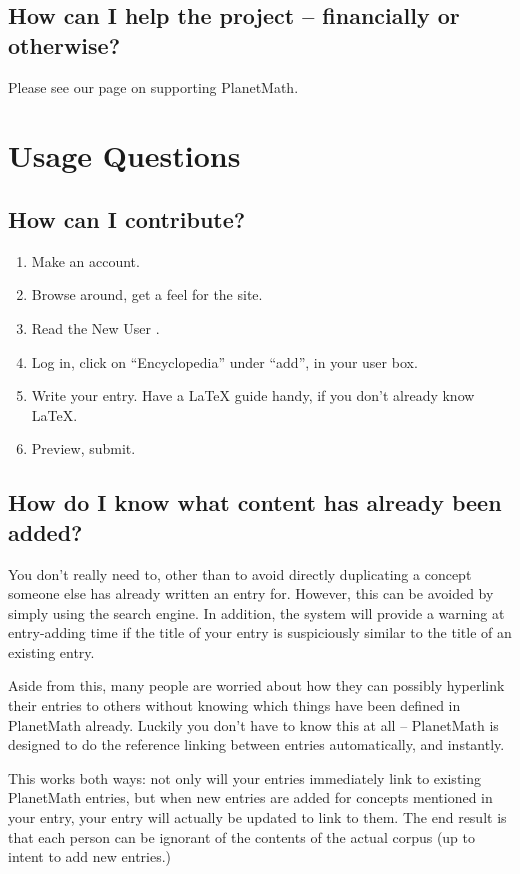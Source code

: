 \subsection{How can I help the project -- financially or otherwise?}
Please see our page on supporting PlanetMath.

\section{Usage Questions}
\subsection{How can I contribute?}
\begin{enumerate}
\item Make an account.
\item Browse around, get a feel for the site.
\item Read the New User .
\item Log in, click on ``Encyclopedia'' under ``add'', in your user box.
\item Write your entry. Have a \LaTeX{} guide handy, if you don't already know \LaTeX{}.
\item Preview, submit. 
\end{enumerate}

\subsection{How do I know what content has already been added?}
You don't really need to, other than to avoid directly duplicating a concept someone else has already written an entry for.  However, this can be avoided by simply using the search engine. In addition, the system will provide a warning at entry-adding time if the title of your entry is suspiciously similar to the title of an existing entry.

Aside from this, many people are worried about how they can possibly hyperlink their entries to others without knowing which things have been defined in PlanetMath already. Luckily you don't have to know this at all -- PlanetMath is designed to do the reference linking between entries automatically, and instantly.

This works both ways: not only will your entries immediately link to existing PlanetMath entries, but when new entries are added for concepts mentioned in your entry, your entry will actually be updated to link to them. The end result is that each person can be ignorant of the contents of the actual corpus (up to intent to add new entries.)

